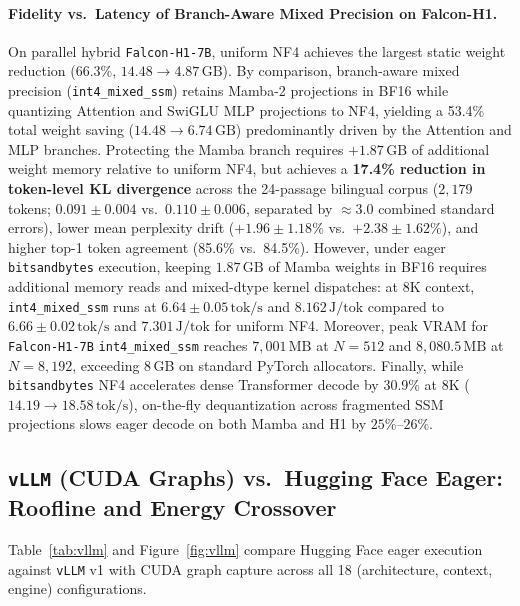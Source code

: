 \documentclass[10pt,a4paper]{article}
\begin{document}
\paragraph{Fidelity vs.\ Latency of Branch-Aware Mixed Precision on Falcon-H1.}
On parallel hybrid \texttt{Falcon-H1-7B}, uniform NF4 achieves the largest static weight reduction (66.3\%, $14.48 \to 4.87\,\text{GB}$). By comparison, branch-aware mixed precision (\mbox{\texttt{int4\_mixed\_ssm}}) retains Mamba-2 projections in BF16 while quantizing Attention and SwiGLU MLP projections to NF4, yielding a 53.4\% total weight saving ($14.48 \to 6.74\,\text{GB}$) predominantly driven by the Attention and MLP branches. Protecting the Mamba branch requires $+1.87\,\text{GB}$ of additional weight memory relative to uniform NF4, but achieves a \textbf{17.4\% reduction in token-level KL divergence} across the 24-passage bilingual corpus ($2{,}179$ tokens; $0.091 \pm 0.004$ vs.\ $0.110 \pm 0.006$, separated by $\approx 3.0$ combined standard errors), lower mean perplexity drift ($+1.96 \pm 1.18\%$ vs.\ $+2.38 \pm 1.62\%$), and higher top-1 token agreement (85.6\% vs.\ 84.5\%). However, under eager \mbox{\texttt{bitsandbytes}} execution, keeping $1.87\,\text{GB}$ of Mamba weights in BF16 requires additional memory reads and mixed-dtype kernel dispatches: at 8K context, \mbox{\texttt{int4\_mixed\_ssm}} runs at $6.64 \pm 0.05\,\text{tok/s}$ and $8.162\,\text{J/tok}$ compared to $6.66 \pm 0.02\,\text{tok/s}$ and $7.301\,\text{J/tok}$ for uniform NF4. Moreover, peak VRAM for \texttt{Falcon-H1-7B} \mbox{\texttt{int4\_mixed\_ssm}} reaches $7{,}001\,\text{MB}$ at $N=512$ and $8{,}080.5\,\text{MB}$ at $N=8{,}192$, exceeding 8\,GB on standard PyTorch allocators. Finally, while \mbox{\texttt{bitsandbytes}} NF4 accelerates dense Transformer decode by 30.9\% at 8K ($14.19 \to 18.58\,\text{tok/s}$), on-the-fly dequantization across fragmented SSM projections slows eager decode on both Mamba and H1 by $25\%\text{--}26\%$.

\subsection{\texttt{vLLM} (CUDA Graphs) vs.\ Hugging Face Eager: Roofline and Energy Crossover}
\label{sec:vllm_results}
Table~\ref{tab:vllm} and Figure~\ref{fig:vllm} compare Hugging Face eager execution against \texttt{vLLM} v1 with CUDA graph capture across all 18 (architecture, context, engine) configurations.
\end{document}
